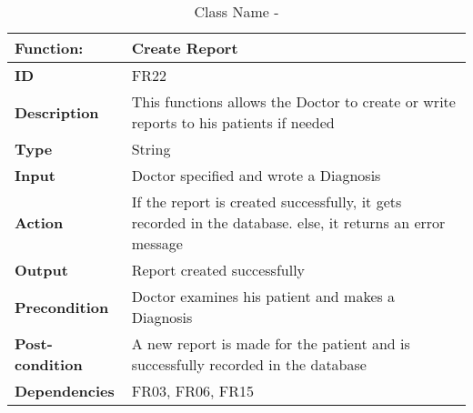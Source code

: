 \documentclass[]{article}
\begin{document}
\FloatBarrier
\begin{table}[h]
\caption{Class Name - }
\label{tab:my-table}
\begin{tabular}{|p{}|p{}|}
\hline
\textbf{Function:} & Create Report
\\ \hline
\textbf{ID}  & FR22           

\\ \hline
\textbf{Description}    & This functions allows the Doctor to create or write reports to his patients if needed                                                                    
\\ \hline
\textbf{Type}    & String         

\\ \hline
\textbf{Input}        & Doctor specified and wrote a Diagnosis

\\ \hline
\textbf{Action}            & If the report is created successfully, it gets recorded in the database. else, it returns an error message  

\\ \hline
\textbf{Output}            & Report created successfully

\\ \hline
\textbf{Precondition}           & Doctor examines his patient and makes a Diagnosis

\\ \hline
\textbf{Post-condition}           & A new report is made for the patient and is successfully recorded in the database


\\ \hline
\textbf{Dependencies}           & FR03, FR06, FR15
\\ \hline
\end{tabular}
\end{table}
\end{document}
